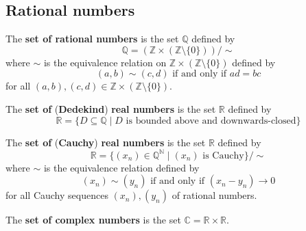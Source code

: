 \subsection*{Rational numbers}


\begin{definition}
\label{defRationalsFromIntegers}
The \textbf{set of rational numbers} is the set $\mathbb{Q}$ defined by
\[ \mathbb{Q} = (\mathbb{Z} \times (\mathbb{Z} \setminus \{ 0 \})) / {\sim} \]
where $\sim$ is the equivalence relation on $\mathbb{Z} \times (\mathbb{Z} \setminus \{0\})$ defined by
\[ (a,b) \sim (c,d) \text{ if and only if } ad=bc \]
for all $(a,b),(c,d) \in \mathbb{Z} \times (\mathbb{Z} \setminus \{ 0 \})$.
\end{definition}



\begin{definition}
\label{defDedekindReals}
The \textbf{set of} (\textbf{Dedekind}) \textbf{real numbers} is the set $\mathbb{R}$ defined by
\[ \mathbb{R} = \{ D \subseteq \mathbb{Q} \mid D \text{ is bounded above and downwards-closed} \} \]
\end{definition}



\begin{definition}
The \textbf{set of} (\textbf{Cauchy}) \textbf{real numbers} is the set $\mathbb{R}$ defined by
\[ \mathbb{R} = \{ (x_n) \in \mathbb{Q}^{\mathbb{N}} \mid (x_n) \text{ is Cauchy} \} / {\sim} \]
where $\sim$ is the equivalence relation defined by
\[ (x_n) \sim (y_n) \text{ if and only if } (x_n-y_n) \to 0 \]
for all Cauchy sequences $(x_n),(y_n)$ of rational numbers.
\end{definition}



\begin{definition}
\label{defComplexNumbersFromReals}
The \textbf{set of complex numbers} is the set $\mathbb{C} = \mathbb{R} \times \mathbb{R}$.
\end{definition}

